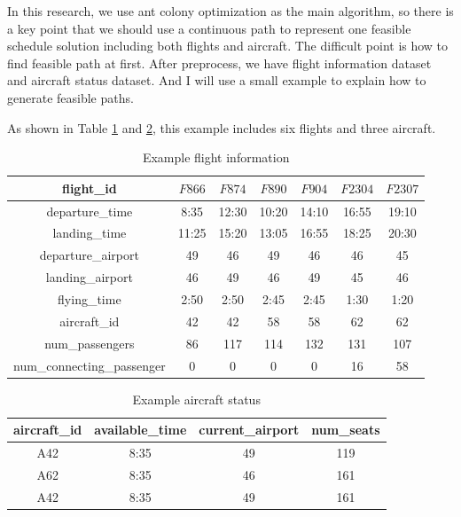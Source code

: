 \documentclass[senior]{IPSstyle}
\begin{document}
In this research, we use ant colony optimization as the main algorithm, so there is a key point that we should use a continuous path to represent one feasible schedule solution including both flights and aircraft. The difficult point is how to find feasible path at first. After preprocess, we have flight information dataset and aircraft status dataset. And I will use a small example to explain how to generate feasible paths. 

As shown in Table \ref{Example flight information} and \ref{Example aircraft status}, this example includes six flights and three aircraft.

\begin{table}[h]
\renewcommand{\arraystretch}{1.2}
\begin{center}
\begin{tabular}{|c|c|c|c|c|c|c|}
\hline
\multicolumn{1}{|c|}{flight\_id}
&\multicolumn{1}{c|}{\(F866\)}
&\multicolumn{1}{c|}{\(F874\)}
&\multicolumn{1}{c|}{\(F890\)}
&\multicolumn{1}{c|}{\(F904\)}
&\multicolumn{1}{c|}{\(F2304\)}
&\multicolumn{1}{c|}{\(F2307\)}
\\  \hline
departure\_time & 8:35 & 12:30 & 10:20 & 14:10 & 16:55 & 19:10
\\	\hline
landing\_time & 11:25 & 15:20 & 13:05 & 16:55 & 18:25 & 20:30
\\	\hline
departure\_airport & 49 & 46 & 49 & 46 & 46 & 45
\\  \hline
landing\_airport & 46 & 49 & 46 & 49 & 45 & 46
\\  \hline
flying\_time & 2:50 & 2:50 & 2:45 & 2:45 & 1:30 & 1:20
\\  \hline
aircraft\_id & 42 & 42 & 58 & 58 & 62 & 62
\\  \hline
num\_passengers & 86 & 117 & 114 & 132 & 131 & 107
\\  \hline
num\_connecting\_passenger & 0 & 0 & 0 & 0 & 16 & 58
\\  \hline
\end{tabular}
\caption{Example flight information}
\label{Example flight information}
\end{center}
\end{table}

\begin{table}[h]
\renewcommand{\arraystretch}{1}
\begin{center}
\begin{tabular}{|c|c|c|c|}
\hline
\multicolumn{1}{|c|}{aircraft\_id}
&\multicolumn{1}{c|}{available\_time}
&\multicolumn{1}{c|}{current\_airport}
&\multicolumn{1}{c|}{num\_seats}

\\  \hline
A42 & 8:35 & 49 & 119
\\	\hline
A62 & 8:35 & 46 & 161
\\	\hline
A42 & 8:35 & 49 & 161
\\  \hline
\end{tabular}
\caption{Example aircraft status}
\label{Example aircraft status}
\end{center}
\end{table}
\end{document}
